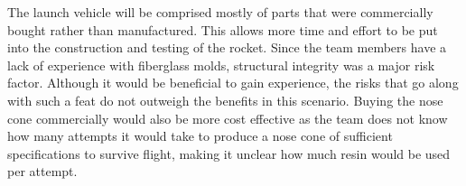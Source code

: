 The launch vehicle will be comprised mostly of parts that were commercially bought rather than manufactured. This allows more time and effort to be put into the construction and testing of the rocket. Since the team members have a lack of experience with fiberglass molds, structural integrity was a major risk factor. Although it would be beneficial to gain experience, the risks that go along with such a feat do not outweigh the benefits in this scenario. Buying the nose cone commercially would also be more cost effective as the team does not know how many attempts it would take to produce a nose cone of sufficient specifications to survive flight, making it unclear how much resin would be used per attempt. 
